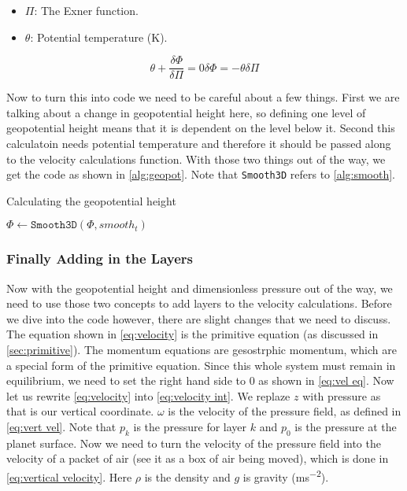 \begin{itemize}
    \item $\Pi$: The Exner function.
    \item $\theta$: Potential temperature (\si{K}).
\end{itemize}

\begin{subequations}
    \begin{equation}
        \theta + \frac{\delta\Phi}{\delta\Pi} = 0
        \label{eq:geopot}
    \end{equation}
    \begin{equation}
        \delta\Phi = -\theta\delta\Pi
        \label{eq:geopot final}
    \end{equation}
\end{subequations}

Now to turn this into code we need to be careful about a few things. First we are talking about a change in geopotential height here, so defining one level of geopotential height means that it 
is dependent on the level below it. Second this calculatoin needs potential temperature and therefore it should be passed along to the velocity calculations function. With those two things out 
of the way, we get the code as shown in \autoref{alg:geopot}. Note that \texttt{Smooth3D} refers to \autoref{alg:smooth}.

\begin{algorithm}
    \caption{Calculating the geopotential height}
    \label{alg:geopot}
    $\Phi \leftarrow \texttt{Smooth3D}(\Phi, smooth_t)$ \;
\end{algorithm}

\subsubsection{Finally Adding in the Layers}
Now with the geopotential height and dimensionless pressure out of the way, we need to use those two concepts to add layers to the velocity calculations. Before we dive into the code however, 
there are slight changes that we need to discuss. The equation shown in \autoref{eq:velocity} is the primitive equation (as discussed in \autoref{sec:primitive}). The momentum equations are 
gesostrphic momentum, which are a special form of the primitive equation. Since this whole system must remain in equilibrium, we need to set the right hand side to $0$ as shown in 
\autoref{eq:vel eq}. Now let us rewrite \autoref{eq:velocity} into \autoref{eq:velocity int}. We replaze $z$ with pressure as that is our vertical coordinate. $\omega$ is the velocity of the 
pressure field, as defined in \autoref{eq:vert vel}. Note that $p_k$ is the pressure for layer $k$ and $p_0$ is the pressure at the planet surface. Now we need to turn the velocity of the 
pressure field into the velocity of a packet of air (see it as a box of air being moved), which is done in \autoref{eq:vertical velocity}. Here $\rho$ is the density and $g$ is gravity 
(\si{ms^{-2}}).

